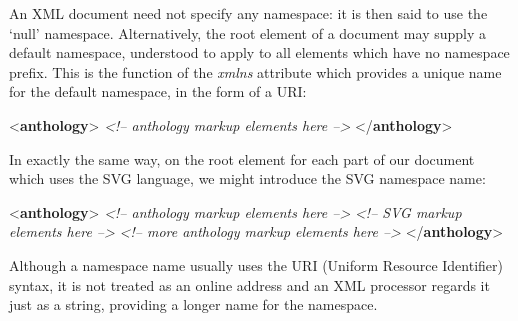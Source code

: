 An XML document need not specify any namespace: it is then said to use the ‘null’ namespace. Alternatively, the root element of a document may supply a default namespace, understood to apply to all elements which have no namespace prefix. This is the function of the {\itshape xmlns} attribute which provides a unique name for the default namespace, in the form of a URI: \par\bgroup\exampleFont \begin{shaded}\noindent\mbox{}{<\textbf{anthology}>}\mbox{}\newline 
\textit{<!-- anthology markup elements here -->}\mbox{}\newline 
{</\textbf{anthology}>}\end{shaded}\egroup\par \noindent  In exactly the same way, on the root element for each part of our document which uses the SVG language, we might introduce the SVG namespace name: \par\bgroup\exampleFont \begin{shaded}\noindent\mbox{}{<\textbf{anthology}>}\mbox{}\newline 
\hspace*{1em}\mbox{}\newline 
\textit{<!-- anthology markup elements here -->}\mbox{}\newline 
{}\mbox{}\newline 
\textit{<!-- SVG markup elements here -->}\mbox{}\newline 
{}\mbox{}\newline 
\textit{<!-- more anthology markup elements here -->}\mbox{}\newline 
{</\textbf{anthology}>}\end{shaded}\egroup\par \noindent  Although a namespace name usually uses the URI (Uniform Resource Identifier) syntax, it is not treated as an online address and an XML processor regards it just as a string, providing a longer name for the namespace.\par
